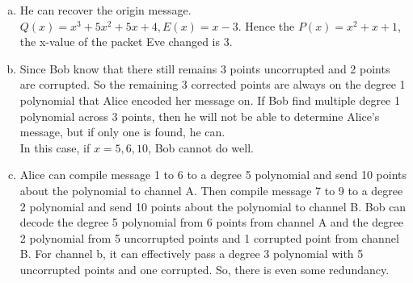 \documentclass{article}
\begin{document}
\begin{enumerate}[(a).]
    \item He can recover the origin message. $Q(x) = x^3 +5x^2+5x+4,E(x) = x−3$. 
    Hence the $P(x) = x^2 + x + 1$, the x-value of the packet Eve changed is 3. 
    
    \item Since Bob know that there still remains 3 points uncorrupted and 2 points are corrupted. 
    So the remaining 3 corrected points are always on the degree 1 polynomial that Alice encoded her message on. 
    If Bob find multiple degree 1 polynomial across 3 points, then he will not be able to determine Alice's message, 
    but if only one is found, he can. \\

    In this case, if $x = 5, 6, 10$, Bob cannot do well. 

    \item Alice can compile message 1 to 6 to a degree 5 polynomial and send 10 points about the polynomial to channel A. 
    Then compile message 7 to 9 to a degree 2 polynomial and send 10 points about the polynomial to channel B. 
    Bob can decode the degree 5 polynomial from 6 points from channel A and 
    the degree 2 polynomial from 5 uncorrupted points and 1 corrupted point from channel B. 
    For channel b, it can effectively pass a degree 3 polynomial with 5 uncorrupted points and one corrupted. 
    So, there is even some redundancy. 
\end{enumerate}
\end{document}
